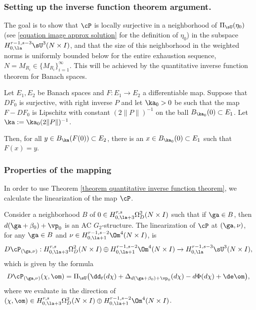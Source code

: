 \documentclass[hidelinks, 12pt, oneside, reqno]{amsart}
\begin{document}
\subsubsection{Setting up the inverse function theorem argument.}\label{section IFT setup}

The goal is to show that $\cP$ is locally surjective in a neighborhood of $\Pi_{\sU} (\eta_0)$ (see \eqref{equation image approx solution} for the definition of $\eta_0$) in the subspace $H_{0,\la}^{r-1,s-3}\sU^3(N \times I)$, and that the size of this neighborhood in the weighted norms is uniformly bounded below for the entire exhaustion sequence, $N = M_{R_i} \in \{M_{R_i}\}_{i=1}^\infty$. This will be achieved by the quantitative inverse function theorem for Banach spaces. 

\begin{thm}\label{theorem quantitative inverse function theorem}
Let $E_1, E_2$ be Banach spaces and $F: E_1 \rightarrow E_2$ a differentiable map. Suppose that $DF_0$ is surjective, with right inverse $P$ and let $\ka_0 > 0$ be such that the map $F - DF_0$ is Lipschitz with constant $(2\| P \|)^{-1}$ on the ball $B_{\ka_0}(0) \subset E_1$. Let $\ka := \ka_0(2\|P\|)^{-1}$. 

Then, for all $y \in B_{\ka}(F(0)) \subset E_2$, there is an $x \in B_{\ka_0}(0) \subset E_1$ such that $F(x) = y$.
\end{thm}

\subsubsection{Properties of the mapping}

In order to use Theorem \ref{theorem quantitative inverse function theorem}, we calculate the linearization of the map $\cP$. 

\begin{lem}
    Consider a neighborhood $B$ of $0 \in H^{r,s}_{0,\la+3} \Omega^2_D(N \times I)$ such that if $\ga \in B$, then $d(\ga + \beta_0) + \vp_0$ is an AC $G_2$-structure. The linearization of $\cP$ at $(\ga, \nu)$, for any $\ga \in B$ and $\nu \in H_{0,\la+1}^{r-1,s-2}\Om^4 (N \times I)$, is
    \[
    D\cP_{(\ga,\nu)} : H^{r,s}_{0,\la+3} \Omega^2_D(N \times I) \oplus H_{0,\la+1}^{r-1,s-2}\Om^4 (N \times I) \rightarrow H_{0,\la}^{r-1,s-3}\sU^3(N \times I),
    \]
    which is given by the formula
    \[
    D\cP_{(\ga,\nu)}(\chi,\om) = \Pi_{\sU} \big(\dd_t (d\chi) + \Delta_{d(\ga + \beta_0) + \vp_0} (d\chi) - d\Phi (d\chi) + \de \om \big),
    \]
    where we evaluate in the direction of $(\chi, \om) \in H^{r,s}_{0,\la+3} \Omega^2_D(N \times I) \oplus H_{0,\la+1}^{r-1,s-2}\Om^4 (N \times I) $.
\end{lem}
\end{document}
